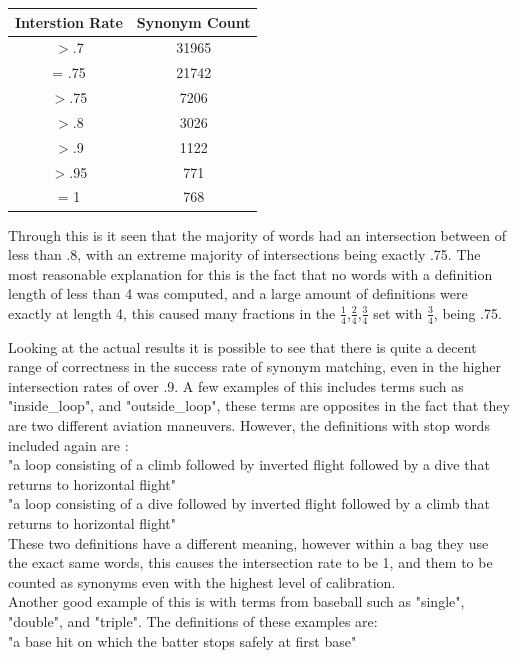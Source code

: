 \documentclass{article}
\begin{document}
\begin{addmargin}[4em]{4em}
\begin{center}
 \begin{tabular}{||c | c||} 
 \hline
 Interstion Rate & Synonym Count \\ [0.5ex] 
 \hline\hline
$>$.7 & 31965 \\ 
 \hline
= .75 & 21742 \\
 \hline
$>$.75 & 7206 \\
 \hline
$>$.8 & 3026 \\
 \hline
$>$.9 & 1122 \\
 \hline
$>$.95 & 771 \\
 \hline
= 1 & 768 \\ [1ex] 
 \hline
\end{tabular}
\end{center}

Through this is it seen that the majority of words had an intersection between of less than .8, with an extreme majority of intersections being exactly .75. The most reasonable explanation for this is the fact that no words with a definition length of less than 4 was computed, and a large amount of definitions were exactly at length 4, this caused many fractions in the $\frac{1}{4}$,$\frac{2}{4}$,$\frac{3}{4}$ set with $\frac{3}{4}$, being .75.
\par Looking at the actual results it is possible to see that there is quite a decent range of correctness in the success rate of synonym matching, even in the higher intersection rates of over .9. A few examples of this includes terms such as "inside\_loop", and "outside\_loop", these terms are opposites in the fact that they are two different aviation maneuvers. However, the definitions with stop words included again are :
\\"a loop consisting of a climb followed by inverted flight followed by a dive that returns to horizontal flight"
\\"a loop consisting of a dive followed by inverted flight followed by a climb that returns to horizontal flight"
\\ These two definitions have a different meaning, however within a bag they use the exact same words, this causes the intersection rate to be 1, and them to be counted as synonyms even with the highest level of calibration.
\\ Another good example of this is with terms from baseball such as "single", "double", and  "triple". The definitions of these examples are:
\\"a base hit on which the batter stops safely at first base"

\end{addmargin}
\end{document}
